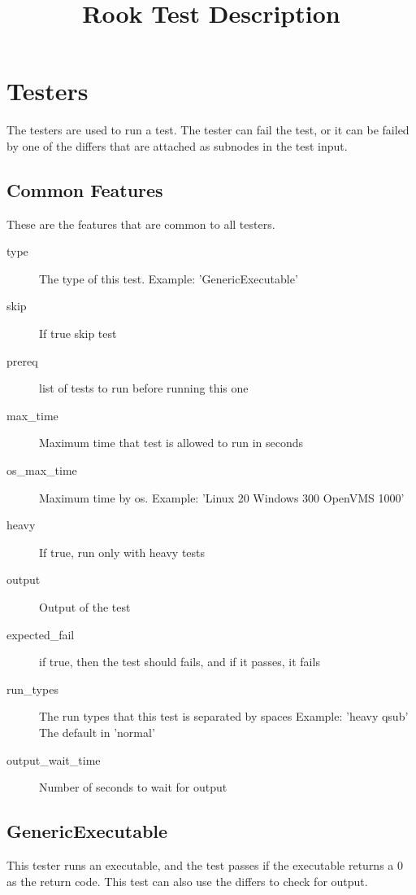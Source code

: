 \documentclass{article}
\title{Rook Test Description}
\begin{document}
\maketitle

\section{Testers}

The testers are used to run a test.  The tester can fail the test, or
it can be failed by one of the differs that are attached as subnodes
in the test input.

\subsection{Common Features}

These are the features that are common to all testers.

\begin{description}
  \item[type] The type of this test. Example: 'GenericExecutable'
  \item[skip] If true skip test
  \item[prereq] list of tests to run before running this one
  \item[max\_time] Maximum time that test is allowed to run in seconds
  \item[os\_max\_time] Maximum time by os. Example: 'Linux 20 Windows 300 OpenVMS 1000'
  \item[heavy] If true, run only with heavy tests
  \item[output] Output of the test
  \item[expected\_fail] if true, then the test should fails, and if it passes, it fails
  \item[run\_types] The run types that this test is separated by spaces Example: 'heavy qsub' The default in 'normal'
  \item[output\_wait\_time] Number of seconds to wait for output
\end{description}

\subsection{GenericExecutable}

This tester runs an executable, and the test passes if the executable
returns a 0 as the return code.  This test can also use the differs to
check for output.
\end{document}
